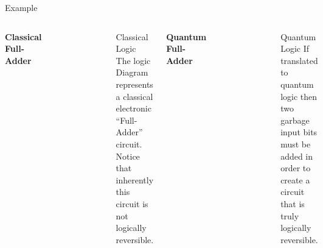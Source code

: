 \documentclass[pdf]{beamer}
\begin{document}
\begin{frame}{Example}
\begin{columns}
\vspace{-2 em}
\begin{center}
\textbf{Classical Full-Adder}
\end{center}
\vspace{-1 em}
\begin{figure}[ht]
\begin{center}
\includegraphics[scale=0.275]{figures/fulladder.png}
\end{center}
\end{figure}
\begin{block}{Classical Logic}
The logic Diagram represents a classical electronic ``Full-Adder'' circuit. Notice that inherently this circuit is not logically reversible. 
\end{block}
\vspace{-2 em}
\begin{center}
\textbf{Quantum Full-Adder}
\end{center}
\vspace{-1 em}
\begin{figure}[ht]
\begin{center}
  \includegraphics[scale=0.4]{figures/Full_adder_qc.png}
\end{center}
\end{figure}
\begin{block}{Quantum Logic}
If translated to quantum logic then two garbage input bits must be added in order to create a circuit that is truly logically reversible. 
\end{block}
\end{columns}

\end{frame}
\end{document}

